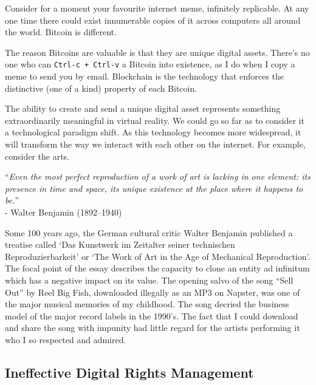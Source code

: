 Consider for a moment your favourite internet meme, infinitely replicable. At any one time there could exist innumerable copies of it across computers all around the world. 
Bitcoin is different.

The reason Bitcoins are valuable is that they are unique digital assets. There's no one who can \texttt{Ctrl-c + Ctrl-v} a Bitcoin into existence, as I do when I copy a meme to send you by email. 
Blockchain is the technology that enforces the distinctive (one of a kind) property of each Bitcoin.

The ability to create and send a unique digital asset represents something extraordinarily meaningful in virtual reality. 
We could go so far as to consider it a technological paradigm shift. As this technology becomes more widespread, it will transform the way we interact with each other on the internet.
For example, consider the arts.

\begin{center}
``\textit{Even the most perfect reproduction of a work of art is lacking in one element: its presence in time and space, its unique existence at the place where it happens to be.}''\\- Walter Benjamin (1892--1940)
\end{center}

Some 100 years ago, the German cultural critic Walter Benjamin published a treatise called `Das Kunstwerk im Zeitalter seiner technischen Reproduzierbarkeit' or `The Work of Art in the Age of Mechanical Reproduction'. 
The focal point of the essay describes the capacity to clone an entity ad infinitum which has a negative impact on its value.
The opening salvo of the song ``Sell Out'' by Reel Big Fish, downloaded illegally as an MP3 on Napster, was one of the major musical memories of my childhood. The song decried the business model of the major record labels in the 1990's.
The fact that I could download and share the song with impunity had little regard for the artists performing it who I so respected and admired.

\subsection*{Ineffective Digital Rights Management}

